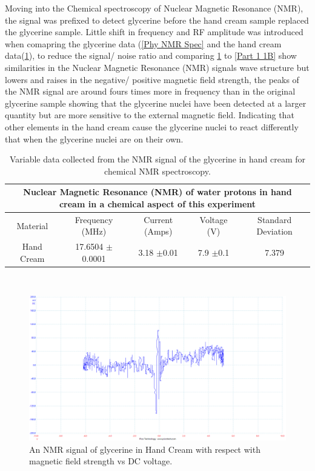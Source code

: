 \documentclass[12pt]{article}
\begin{document}
Moving into the Chemical spectroscopy of Nuclear Magnetic Resonance (NMR), the signal was prefixed to detect glycerine before the hand cream sample replaced the glycerine sample. Little shift in frequency and RF amplitude was introduced when comapring the glycerine data (\cref{Phy NMR Spec} and the hand cream data(\cref{Chem NMR Spec}), to reduce the signal/ noise ratio and comparing \cref{Part 1 5B} to \cref{Part 1 1B} show similarities in the Nuclear Magnetic Resonance (NMR) signals wave structure but lowers and raises in the negative/ positive magnetic field strength, the peaks of the NMR signal are around fours times more in frequency than in the original glycerine sample showing that the glycerine nuclei have been detected at a larger quantity but are more sensitive to the external magnetic field. Indicating that other elements in the hand cream cause the glycerine nuclei to react differently that when the glycerine nuclei are on their own. \\

\begin{table}[H]
\begin{center}
 \footnotesize
 \begin{tabular}{|c||c||c||c||c|}
 \hline
 \multicolumn{5}{|c|}{Nuclear Magnetic Resonance (NMR) of water protons in hand cream in a chemical aspect of this experiment} \\
 \hline
 Material & Frequency (MHz)  & Current (Amps)  & Voltage (V) & Standard Deviation \\
 \hline \hline
 Hand Cream & 17.6504 $\pm$0.0001  & 3.18 $\pm$0.01  & 7.9 $\pm$0.1 & 7.379\\
 \hline
 \end{tabular} \\ 
 \caption{Variable data collected from the NMR signal of the glycerine in hand cream for chemical NMR spectroscopy.}
 \label{Chem NMR Spec}
\end{center}
\end{table}

\begin{figure}[H]
\centering
\includegraphics[scale=0.45]{Images/Report/Part A/5B.png}
\caption{An NMR signal of glycerine in Hand Cream with respect with magnetic field strength vs DC voltage.}
\label{Part 1 5B}
\end{figure}
\end{document}
